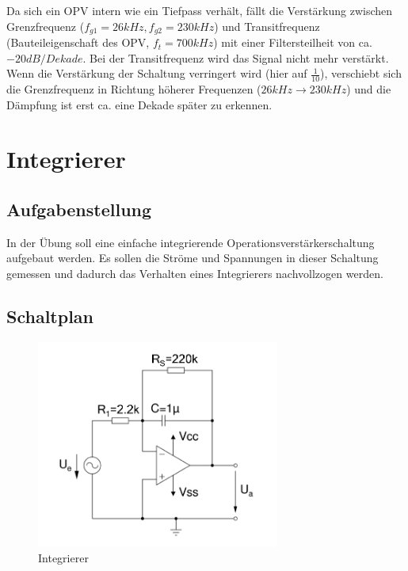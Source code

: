 \documentclass[12pt,a4paper,titlepage]{article}
\begin{document}
\noindent Da sich ein OPV intern wie ein Tiefpass verhält, fällt die Verstärkung zwischen Grenzfrequenz ($f_{g1}=26kHz, f_{g2}=230kHz$) und Transitfrequenz (Bauteileigenschaft des OPV, $f_t = 700kHz$) mit einer Filtersteilheit von ca. $-20dB/Dekade$. Bei der Transitfrequenz wird das Signal nicht mehr verstärkt.\\
Wenn die Verstärkung der Schaltung verringert wird (hier auf $\frac{1}{10}$), verschiebt sich die Grenzfrequenz in Richtung höherer Frequenzen ($26kHz \to 230kHz$) und die Dämpfung ist erst ca. eine Dekade später zu erkennen.

\section{Integrierer}


\subsection*{Aufgabenstellung}
In der \"Ubung soll eine einfache integrierende Operationsverstärkerschaltung aufgebaut werden. Es sollen die Str\"ome und Spannungen in dieser Schaltung gemessen und dadurch das Verhalten eines Integrierers nachvollzogen werden.

\subsection*{Schaltplan}
\begin{figure}[H]
  \centering
  \includegraphics[width=80mm]{integrierer_opv_schaltung.png}
  \caption{Integrierer}
  \label{figure31}
\end{figure}
\end{document}
